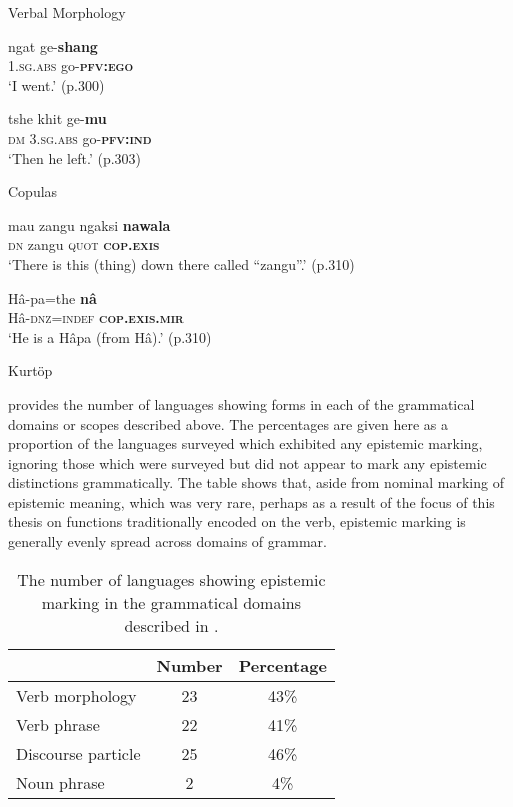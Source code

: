 \begin{exe}
\ex Verbal Morphology \label{e:Methods:KurtopScope1}
\begin{xlist}
\ex
\gll ngat ge-\textbf{shang} \\
1.\textsc{sg.abs} go-\textsc{\textbf{pfv:ego}} \\
\glt `I went.' (p.300)

\ex
\gll tshe khit ge-\textbf{mu} \\
\textsc{dm} \textsc{3.sg.abs} go-\textsc{\textbf{pfv:ind}} \\
\glt `Then he left.' (p.303)

\end{xlist}

\ex Copulas \label{e:Methods:KurtopScope2}
\begin{xlist}
\ex 
\gll mau zangu ngaksi \textbf{nawala} \\
\textsc{dn} zangu \textsc{quot} \textsc{\textbf{cop.exis}} \\
\glt `There is this (thing) down there called ``zangu''.' (p.310)

\ex
\gll Hâ-pa=the \textbf{nâ} \\
Hâ-\textsc{dnz=indef} \textsc{\textbf{cop.exis.mir}} \\
\glt `He is a Hâpa (from Hâ).' (p.310)
\end{xlist}
Kurtöp \cite[East Bodish: Bhutan,][]{Hyslop2017}
\end{exe}

 provides the number of languages showing forms in each of the grammatical domains or scopes described above. The percentages are given here as a proportion of the languages surveyed which exhibited any epistemic marking, ignoring those which were surveyed but did not appear to mark any epistemic distinctions grammatically. The table shows that, aside from nominal marking of epistemic meaning, which was very rare, perhaps as a result of the focus of this thesis on functions traditionally encoded on the verb, epistemic marking is generally evenly spread across domains of grammar.

\begin{table}\caption{The number of languages showing epistemic marking in the grammatical domains described in .}\label{t:Methods:ScopeStats}
  \centering
  \begin{tabular}{lcc}
  \hline
   & Number & Percentage \\ \hline
  Verb morphology & 23 & 43\% \\
  Verb phrase & 22 & 41\% \\
  Discourse particle & 25 & 46\% \\
  Noun phrase & 2 & 4\% \\ \hline
  \end{tabular}
  \end{table}

